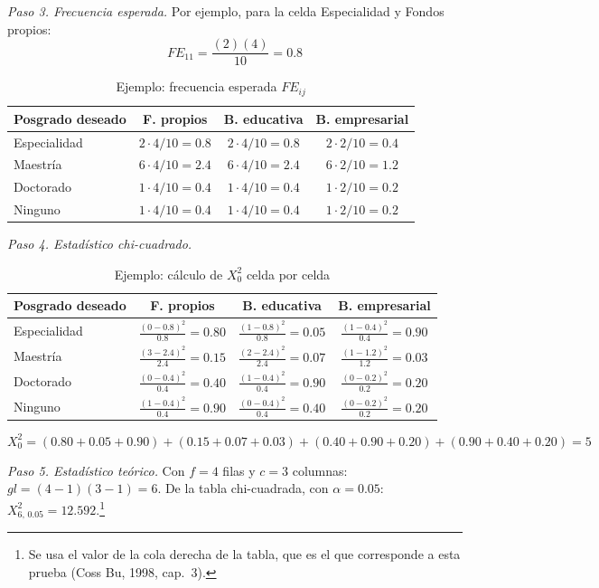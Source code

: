 \documentclass[12pt, a4paper]{article}
\newenvironment{mitabla}[2][H]{%
  \begin{table}[#1]
  \centering
  \caption{#2}
  \small
}{%
  \end{table}
}
\begin{document}
\textit{Paso 3. Frecuencia esperada.} Por ejemplo, para la celda
Especialidad y Fondos propios:
\[
FE_{11} = \frac{(2)(4)}{10} = 0.8
\]

\begin{mitabla}{Ejemplo: frecuencia esperada $FE_{ij}$}
\begin{tabular}{lccc}
\toprule
Posgrado deseado & F. propios & B. educativa & B. empresarial \\
\midrule
Especialidad & $2\cdot4/10 = 0.8$ & $2\cdot4/10 = 0.8$ & $2\cdot2/10 = 0.4$ \\
Maestría & $6\cdot4/10 = 2.4$ & $6\cdot4/10 = 2.4$ & $6\cdot2/10 = 1.2$ \\
Doctorado & $1\cdot4/10 = 0.4$ & $1\cdot4/10 = 0.4$ & $1\cdot2/10 = 0.2$ \\
Ninguno & $1\cdot4/10 = 0.4$ & $1\cdot4/10 = 0.4$ & $1\cdot2/10 = 0.2$ \\
\bottomrule
\end{tabular}
\end{mitabla}

\textit{Paso 4. Estadístico chi-cuadrado.}

\begin{mitabla}{Ejemplo: cálculo de $X_0^2$ celda por celda}
\begin{tabular}{lccc}
\toprule
Posgrado deseado & F. propios & B. educativa & B. empresarial \\
\midrule
Especialidad & $\frac{(0-0.8)^2}{0.8} = 0.80$ & $\frac{(1-0.8)^2}{0.8} = 0.05$ & $\frac{(1-0.4)^2}{0.4} = 0.90$ \\[3pt]
Maestría & $\frac{(3-2.4)^2}{2.4} = 0.15$ & $\frac{(2-2.4)^2}{2.4} = 0.07$ & $\frac{(1-1.2)^2}{1.2} = 0.03$ \\[3pt]
Doctorado & $\frac{(0-0.4)^2}{0.4} = 0.40$ & $\frac{(1-0.4)^2}{0.4} = 0.90$ & $\frac{(0-0.2)^2}{0.2} = 0.20$ \\[3pt]
Ninguno & $\frac{(1-0.4)^2}{0.4} = 0.90$ & $\frac{(0-0.4)^2}{0.4} = 0.40$ & $\frac{(0-0.2)^2}{0.2} = 0.20$ \\
\bottomrule
\end{tabular}
\end{mitabla}
\[
X_0^2 = (0.80 + 0.05 + 0.90) + (0.15 + 0.07 + 0.03) + (0.40 + 0.90 + 0.20) + (0.90 + 0.40 + 0.20) = 5
\]

\textit{Paso 5. Estadístico teórico.} Con $f = 4$ filas y $c = 3$
columnas: $gl = (4-1)(3-1) = 6$. De la tabla chi-cuadrada, con
$\alpha = 0.05$: $X^2_{6,\,0.05} = 12.592$.\footnote{Se usa el valor de
la cola derecha de la tabla, que es el que corresponde a esta prueba
(Coss Bu, 1998, cap.~3).}
\end{document}
